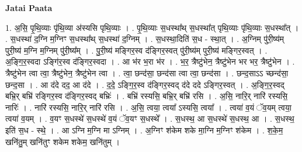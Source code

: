 \documentclass[17pt]{extarticle}
\begin{document}
\textbf{Jatai Paata} \newline

1. अ॒सि॒ पृ॒थि॒व्याः पृ॑थि॒व्या अ॑स्यसि पृथि॒व्याः । . पृ॒थि॒व्याः स॒धस्था᳚थ् स॒धस्था᳚त् पृथि॒व्याः पृ॑थि॒व्याः स॒धस्था᳚त् । . स॒धस्था॑ द॒ग्नि म॒ग्निꣳ स॒धस्था᳚थ् स॒धस्था॑ द॒ग्निम् । . स॒धस्था॒दिति॑ स॒ध - स्था॒त् । . अ॒ग्निम् पु॑री॒ष्य॑म् पुरी॒ष्य॑ म॒ग्नि म॒ग्निम् पु॑री॒ष्य᳚म् । . पु॒री॒ष्य॑ मङ्गिर॒स्व द॑ङ्गिर॒स्वत् पु॑री॒ष्य॑म् पुरी॒ष्य॑ मङ्गिर॒स्वत् । . अ॒ङ्गि॒र॒स्वदा ऽङ्गि॑र॒स्व द॑ङ्गिर॒स्वदा । . आ भ॑र भ॒रा भ॑र । . भ॒र॒ त्रैष्टु॑भेन॒ त्रैष्टु॑भेन भर भर॒ त्रैष्टु॑भेन । . त्रैष्टु॑भेन त्वा त्वा॒ त्रैष्टु॑भेन॒ त्रैष्टु॑भेन त्वा । . त्वा॒ छन्द॑सा॒ छन्द॑सा त्वा त्वा॒ छन्द॑सा । . छन्द॒साऽऽ च्छन्द॑सा॒ छन्द॒सा । . आ द॑दे दद॒ आ द॑दे । . द॒दे॒ ऽङ्गि॒र॒स्व द॑ङ्गिर॒स्वद् द॑दे ददे ऽङ्गिर॒स्वत् । . अ॒ङ्गि॒र॒स्वद् बभ्रि॒र् बभ्रि॑ रङ्गिर॒स्व द॑ङ्गिर॒स्वद् बभ्रिः॑ । . बभ्रि॑ रस्यसि॒ बभ्रि॒र् बभ्रि॑ रसि । . अ॒सि॒ नारि॒र् नारि॑ रस्यसि॒ नारिः॑ । . नारि॑ रस्यसि॒ नारि॒र् नारि॑ रसि । . अ॒सि॒ त्वया॒ त्वया᳚ ऽस्यसि॒ त्वया᳚ । . त्वया॑ व॒यं ॅव॒यम् त्वया॒ त्वया॑ व॒यम् । . व॒यꣳ स॒धस्थे॑ स॒धस्थे॑ व॒यं ॅव॒यꣳ स॒धस्थे᳚ । . स॒धस्थ॒ आ स॒धस्थे॑ स॒धस्थ॒ आ । . स॒धस्थ॒ इति॑ स॒ध - स्थे॒ । . आ ऽग्नि म॒ग्नि मा ऽग्निम् । . अ॒ग्निꣳ श॑केम शके मा॒ग्नि म॒ग्निꣳ श॑केम । . श॒के॒म॒ खनि॑तु॒म् खनि॑तुꣳ शकेम शकेम॒ खनि॑तुम् । \newline
\end{document}
